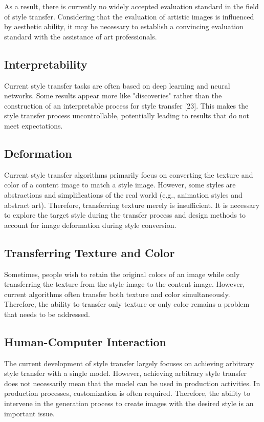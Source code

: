As a result, there is currently no widely accepted evaluation standard in the field of style transfer. Considering that the evaluation of artistic images is influenced by aesthetic ability, it may be necessary to establish a convincing evaluation standard with the assistance of art professionals.

\subsection{Interpretability}

Current style transfer tasks are often based on deep learning and neural networks. Some results appear more like "discoveries" rather than the construction of an interpretable process for style transfer [23]. This makes the style transfer process uncontrollable, potentially leading to results that do not meet expectations.

\subsection{Deformation}

Current style transfer algorithms primarily focus on converting the texture and color of a content image to match a style image. However, some styles are abstractions and simplifications of the real world (e.g., animation styles and abstract art). Therefore, transferring texture merely is insufficient. It is necessary to explore the target style during the transfer process and design methods to account for image deformation during style conversion.

\subsection{Transferring Texture and Color}

Sometimes, people wish to retain the original colors of an image while only transferring the texture from the style image to the content image. However, current algorithms often transfer both texture and color simultaneously. Therefore, the ability to transfer only texture or only color remains a problem that needs to be addressed.


\subsection{Human-Computer Interaction}

The current development of style transfer largely focuses on achieving arbitrary style transfer with a single model. However, achieving arbitrary style transfer does not necessarily mean that the model can be used in production activities. In production processes, customization is often required. Therefore, the ability to intervene in the generation process to create images with the desired style is an important issue.